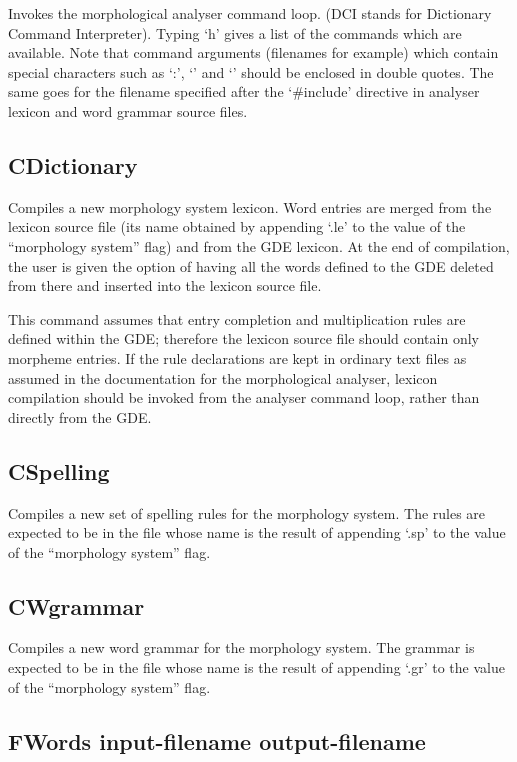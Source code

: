 Invokes the morphological analyser command loop. (DCI stands for
Dictionary Command Interpreter). Typing `h' gives a list of the
commands which are available. Note that command arguments (filenames for
example) which contain special characters such as `:', `\ra'
and `\la' should be enclosed in double quotes. The same goes for the
filename specified after the `\#include' directive in analyser
lexicon and word grammar source files.

\subsection{CDictionary}

Compiles a new morphology system lexicon. Word entries are merged from
the lexicon source file (its name obtained by appending `.le' to the
value of the ``morphology system'' flag) and from the GDE
lexicon.  At the end of compilation, the user is given the option of
having all the words defined to the GDE deleted from there and inserted
into the lexicon source file.

This command assumes that entry completion and multiplication rules are
defined within the GDE; therefore the lexicon source file should contain
only morpheme entries. If the rule declarations are kept in ordinary
text files as assumed in the documentation for the morphological
analyser, lexicon compilation should be invoked from the analyser
command loop, rather than directly from the GDE.

\subsection{CSpelling}

Compiles a new set of spelling rules for the morphology system. The
rules are expected to be in the file whose name is the result of appending
`.sp' to the value of the ``morphology system'' flag.

\subsection{CWgrammar}

Compiles a new word grammar for the morphology system. The grammar is 
expected to be in the file whose name is the result of appending `.gr'
to the value of the ``morphology system'' flag.

\subsection{FWords input-filename output-filename}

